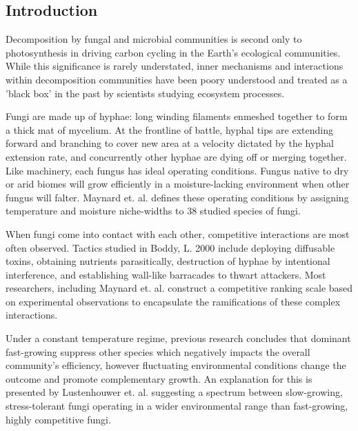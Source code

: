 \documentclass[12pt]{article}
\begin{document}
\begin{multicols}{2}
	
	
\section{Introduction}

Decomposition by fungal and microbial communities is second only to photosynthesis in driving carbon cycling in the Earth's ecological communities. \cite{McGuire2010} While this significance is rarely understated, inner mechanisms and interactions within decomposition communities have been poory understood and treated as a 'black box' in the past by scientists studying ecosystem processes. \cite{Andren1999}

Fungi are made up of hyphae: long winding filaments enmeshed together to form a thick mat of mycelium. At the frontline of battle, hyphal tips are extending forward and branching to cover new area at a velocity dictated by the hyphal extension rate, and concurrently other hyphae are dying off or merging together. \cite{Edelstein1982} Like machinery, each fungus has ideal operating conditions. Fungus native to dry or arid biomes will grow efficiently in a moisture-lacking environment when other fungus will falter. Maynard et. al. defines these operating conditions by assigning temperature and moisture niche-widths to 38 studied species of fungi. 

When fungi come into contact with each other, competitive interactions are most often observed. Tactics studied in Boddy, L. 2000 include deploying diffusable toxins, obtaining nutrients parasitically, destruction of hyphae by intentional interference, and establishing wall-like barracades to thwart attackers. \cite{Boddy2000} Most researchers, including Maynard et. al. construct a competitive ranking scale based on experimental observations to encapsulate the ramifications of these complex interactions. 

Under a constant temperature regime, previous research concludes that dominant fast-growing suppress other species which negatively impacts the overall community's efficiency, however fluctuating environmental conditions change the outcome and promote complementary growth. \cite{Toljander2006} An explanation for this is presented by Lustenhouwer et. al. suggesting a spectrum between slow-growing, stress-tolerant fungi operating in a wider environmental range than fast-growing, highly competitive fungi. \cite{Lustenhouwer2020} 


\end{multicols}
\end{document}
